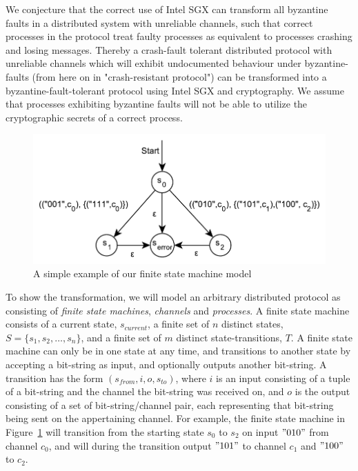 \documentclass{article}
\begin{document}
	We conjecture that the correct use of Intel SGX can transform all byzantine faults in a distributed system with unreliable channels, such that correct processes in the protocol treat faulty processes as equivalent to processes crashing and losing messages.
	Thereby a crash-fault tolerant distributed protocol with unreliable channels which will exhibit undocumented behaviour under byzantine-faults (from here on in "crash-resistant protocol") can be transformed into a byzantine-fault-tolerant protocol using Intel SGX and cryptography.
	We assume that processes exhibiting byzantine faults will not be able to utilize the cryptographic secrets of a correct process.

	\begin{figure}[!ht]
		\center
		\includegraphics[scale=0.6]{figures/state-machines/simple-NFA.pdf}
		\caption{A simple example of our finite state machine model\label{fig:simple-nfa}}
	\end{figure}

	To show the transformation, we will model an arbitrary distributed protocol as consisting of \textit{finite state machines}, \textit{channels} and \textit{processes}.
	A finite state machine consists of a current state, $s_{current}$, a finite set of $n$ distinct states, $S=\{s_1, s_2, \dots, s_n\}$, and a finite set of $m$ distinct state-transitions, $T$.
	A finite state machine can only be in one state at any time, and transitions to another state by accepting a bit-string as input, and optionally outputs another bit-string.
	A transition has the form $(s_{from}, i, o, s_{to})$, where $i$ is an input consisting of a tuple of a bit-string and the channel the bit-string was received on, and $o$ is the output consisting of a set of bit-string/channel pair, each representing that bit-string being sent on the appertaining channel.
	For example, the finite state machine in Figure~\ref{fig:simple-nfa} will transition from the starting state $s_0$ to $s_2$ on input $"010"$ from channel $c_0$, and will during the transition output $"101"$ to channel $c_1$ and $"100"$ to $c_2$.
\end{document}
